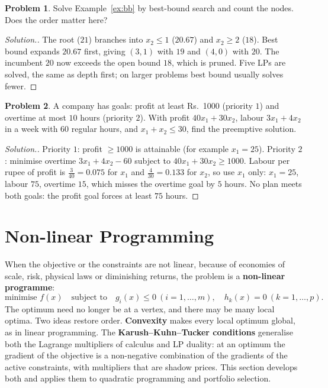 \documentclass[11pt,a4paper]{article}
\numberwithin{equation}{section}
\theoremstyle{definition}
\newtheorem{problemx}{Problem}[subsection]
\newenvironment{problem}{\begin{problemx}}{\end{problemx}}
\newenvironment{solution}
  {\renewcommand{\qedsymbol}{}\begin{proof}[\textit{Solution}.]}
  {\end{proof}}
\begin{document}
\begin{problem}
Solve Example~\ref{ex:bb} by best-bound search and count the nodes. Does the order matter here?
\end{problem}

\begin{solution}
The root ($21$) branches into $x_2 \leq 1$ ($20.67$) and $x_2 \geq 2$ ($18$). Best bound expands $20.67$ first, giving $(3, 1)$ with $19$ and $(4, 0)$ with $20$. The incumbent $20$ now exceeds the open bound $18$, which is pruned. Five LPs are solved, the same as depth first; on larger problems best bound usually
solves fewer.
\end{solution}

\begin{problem}
A company has goals: profit at least Rs.~1000 (priority $1$) and overtime at most $10$ hours (priority $2$). With profit $40x_1 + 30x_2$, labour $3x_1 + 4x_2$ in a week with $60$ regular hours, and $x_1 + x_2 \leq 30$, find the preemptive solution.
\end{problem}

\begin{solution}
Priority $1$: profit $\geq 1000$ is attainable (for example $x_1 = 25$). Priority $2$: minimise overtime $3x_1 + 4x_2 - 60$ subject to $40x_1 + 30x_2 \geq 1000$. Labour per rupee of profit is $\frac3{40} = 0.075$ for $x_1$ and $\frac4{30} = 0.133$ for $x_2$, so use $x_1$ only: $x_1 = 25$, labour $75$, overtime $15$, which misses the
overtime goal by $5$ hours. No plan meets both goals: the profit goal forces at least $75$ hours.
\end{solution}

\section{Non-linear Programming}
\label{sec:nlp}

When the objective or the constraints are not linear, because of economies of scale, risk, physical laws or diminishing returns, the problem is a \textbf{non-linear programme}:
\[
\text{minimise } f(x) \quad\text{subject to}\quad g_i(x) \leq 0 \ (i = 1, \ldots, m), \quad h_k(x) = 0 \ (k = 1, \ldots, p) .
\]
The optimum need no longer be at a vertex, and there may be many local optima. Two ideas restore order. \textbf{Convexity} makes every local optimum global, as in linear programming. The \textbf{Karush--Kuhn--Tucker conditions} generalise both the Lagrange multipliers of calculus and LP duality: at an optimum the gradient of the
objective is a non-negative combination of the gradients of the active constraints, with multipliers that are shadow prices. This section develops both and applies them to quadratic programming and portfolio selection.
\end{document}
